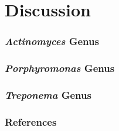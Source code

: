\documentclass{beamer}
\begin{document}
    \section{Discussion}
    \begin{frame}
        \frametitle{\textit{Actinomyces} Genus}
    \end{frame}

    \begin{frame}
        \frametitle{\textit{Porphyromonas} Genus}
    \end{frame}

    \begin{frame}
        \frametitle{\textit{Treponema} Genus}
    \end{frame}

    \begin{frame}[allowframebreaks]
        \frametitle{References}
        
        
    \end{frame}
\end{document}

